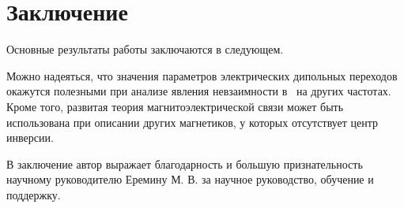 \chapter*{Заключение}                       %


Основные результаты работы заключаются в следующем.

Можно надеяться, что значения параметров электрических дипольных переходов окажутся полезными при анализе явления невзаимности в \cbo\ на других частотах. Кроме того, развитая теория магнитоэлектрической связи может быть использована при описании других магнетиков, у которых отсутствует центр инверсии.


В заключение автор выражает благодарность и большую признательность научному руководителю
Еремину М. В. за научное руководство, обучение и поддержку.
